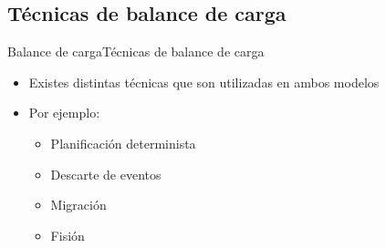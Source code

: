 \subsection*{Técnicas de balance de carga}
\begin{frame}{Balance de carga}{Técnicas de balance de carga}
\begin{itemize}
\item Existes distintas técnicas que son utilizadas en ambos modelos
\item Por ejemplo:
\begin{itemize}
	\item Planificación determinista \cite{XuCTS14, DongTS07}
	\item Descarte de eventos \cite{SheuC09}
	\item Migración \cite{XingZH05}
	\item Fisión \cite{GulisanoJPSV12, IshiiS11, GedikSHW14, FernandezMKP13}
\end{itemize}
\end{itemize}
\end{frame}